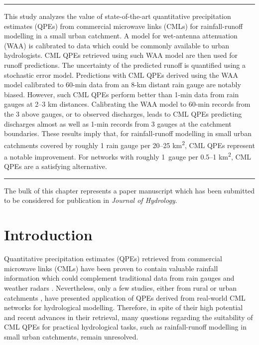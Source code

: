 \documentclass{ctuthesis}\usepackage[]{graphicx}\usepackage[]{color}
\begin{document}

\vspace*{-0.4cm}
\rule{\textwidth}{0.4pt}
This study analyzes the value of state-of-the-art quantitative precipitation estimates (QPEs) from commercial microwave links (CMLs) for rainfall-runoff modelling in a small urban catchment. A model for wet-antenna attenuation (WAA) is calibrated to data which could be commonly available to urban hydrologists. CML QPEs retrieved using such  WAA model are then used for runoff predictions. The uncertainty of the predicted runoff is quantified using a stochastic error model. Predictions with CML QPEs derived using the WAA model calibrated to 60-min data from an 8-km distant rain gauge are notably biased. However, such CML QPEs perform better than 1-min data from rain gauges at 2--3 km distances. Calibrating the WAA model to 60-min records from the 3 above gauges, or to observed discharges, leads to CML QPEs predicting discharges almost as well as 1-min records from 3 gauges at the catchment boundaries. These results imply that, for rainfall-runoff modelling in small urban catchments covered by roughly 1 rain gauge per 20--25 km\textsuperscript{2}, CML QPEs represent a notable improvement. For networks with roughly  1~gauge per 0.5--1 km\textsuperscript{2}, CML QPEs are  a satisfying alternative. 
\newline  \vspace*{-0.2cm}
\rule[0.2cm]{\textwidth}{0.4pt}
{\footnotesize The bulk of this chapter represents a paper manuscript which has been submitted to be considered for publication in \emph{Journal of Hydrology}. }

\vspace*{-0.3cm}


\section{Introduction}

Quantitative precipitation estimates (QPEs) retrieved from commercial microwave links (CMLs) have been proven to contain valuable rainfall information which could complement traditional data from rain gauges and weather radars \citep{chwalaCommercialMicrowaveLink2019, imhoffRainfallNowcastingUsing2020, riosgaonaRainfallRetrievalCommercial2018, uijlenhoetOpportunisticRemoteSensing2018}. Nevertheless, only a few studies, either from rural \citep{brauerEffectDifferencesRainfall2016, cazzanigaCalculatingHydrologicalResponse2020, smiatekPotentialCommercialMicrowave2017} or urban catchments \citep{dischImpactDifferentSources2019, pastorekCommercialMicrowaveLinks2019, stranskyRunoffPredictionUsing2018}, have presented application of QPEs derived from real-world CML networks for hydrological modelling. Therefore, in spite of their high potential and recent advances in their retrieval, many questions regarding the suitability of CML QPEs for practical hydrological tasks, such as rainfall-runoff modelling in small urban catchments, remain unresolved.
\end{document}
